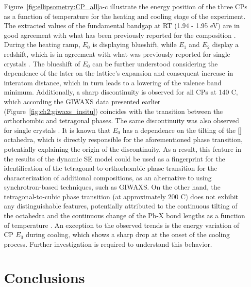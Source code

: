 Figure~\ref{fig:ellipsometry:CP_all}a-c illustrate the energy position of the three CPs as a function of temperature for the heating and cooling stage of the experiment. The extracted values of the fundamental bandgap at RT (1.94 - 1.95 eV) are in good agreement with what has been previously reported for the  composition \cite{Yuan2021Moisture-stimulatedProperties, Chen2019ThePerovskite,Parida2019Two-stepStability, Igual-Munoz2020Room-TemperaturePrecursors, Mali2021ImplementingCells}. During the heating ramp, $E_0$ is displaying blueshift, while $E_1$ and $E_2$ display a redshift, which is in agreement with what was previously reported for  single crystals \cite{Ceratti2021CsPbBr3Air}. The blueshift of $E_0$ can be further understood considering the dependence of the later on the lattice's expansion and consequent increase in interatom distance, which in turn leads to a lowering of the valence band minimum. Additionally, a sharp discontinuity is observed for all CPs at 140 \degree C, which according the GIWAXS data presented earlier (Figure~\ref{fig:ch2:giwaxs_insitu}) coincides with the transition between the orthorhombic and tetragonal phases. The same discontinuity was also observed for  single crystals \cite{Mannino2020Temperature-DependentCrystals}. It is known that $E_0$ has a dependence on the tilting of the [] octahedra, which is directly responsible for the aforementioned phase transition, potentially explaining the origin of the discontinuity. As a result, this feature in the results of the dynamic SE model could be used as a fingerprint for the identification of the tetragonal-to-orthorhombic phase transition for the characterization of additional compositions, as an alternative to using synchrotron-based techniques, such as GIWAXS. On the other hand, the tetragonal-to-cubic phase transition (at approximately 200 \degree C) does not exhibit any distinguishable features, potentially attributed to the continuous tilting of the  octahedra and the continuous change of the Pb-X bond lengths as a function of temperature \cite{Foley2015TemperaturePerovskite}. An exception to the observed trends is the energy variation of CP $E_0$ during cooling, which shows a sharp drop at the onset of the cooling process. Further investigation is required to understand this behavior.



\section{Conclusions}

